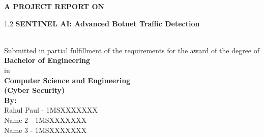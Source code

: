 \thispagestyle{frontmatter}

\begin{titlepage}
\begin{center}

\vspace*{3cm}

{\Large \textbf{A PROJECT REPORT ON}}\\[1.5cm]

\begin{minipage}{0.8\textwidth}
    \centering
    \begin{spacing}{1.2}
        {\Huge \textbf{SENTINEL AI: Advanced Botnet Traffic Detection}}
    \end{spacing}
\end{minipage}\\[2cm]

{\large Submitted in partial fulfillment of the requirements for the award of the degree of}\\[0.3cm]
{\Large \textbf{Bachelor of Engineering}}\\[0.3cm]
{\large in}\\[0.3cm]
{\Large \textbf{Computer Science and Engineering}}\\[0.1cm]
{\Large \textbf{(Cyber Security)}}\\[2cm]

{\large \textbf{By:}}\\[0.5cm]
{\large Rahul Paul - 1MSXXXXXXX}\\[0.2cm]
{\large Name 2 - 1MSXXXXXXX}\\[0.2cm]
{\large Name 3 - 1MSXXXXXXX}\\[3cm]

\end{center}
\end{titlepage}
